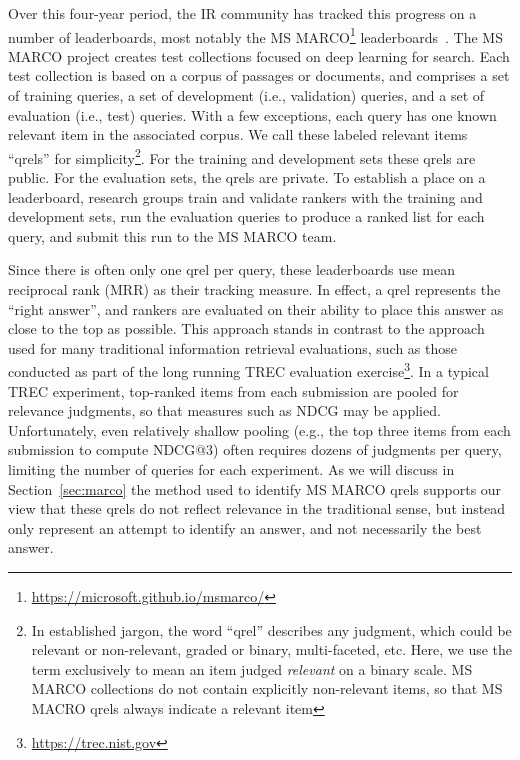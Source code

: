 \documentclass[fullpage]{article}
\begin{document}
Over this four-year period, the IR community has tracked this progress on a number of leaderboards, most notably the MS MARCO\footnote{\url{https://microsoft.github.io/msmarco/}} leaderboards~\cite{marco21short,marco21full}. The MS MARCO project creates test collections focused on deep learning for search. Each test collection is based on a corpus of passages or documents, and comprises a set of training queries, a set of development (i.e., validation) queries, and a set of evaluation (i.e., test) queries. With a few exceptions, each query has one known relevant item in the associated corpus. We call these labeled relevant items ``qrels'' for simplicity\footnote{In established jargon, the word ``qrel'' describes any judgment, which could be relevant or non-relevant, graded or binary, multi-faceted, etc. Here, we use the term exclusively to mean an item judged {\em relevant} on a binary scale. MS MARCO collections do not contain explicitly non-relevant items, so that MS MACRO qrels always indicate a relevant item}. For the training and development sets these qrels are public. For the evaluation sets, the qrels are private. To establish a place on a leaderboard, research groups train and validate rankers with the training and development sets, run the evaluation queries to produce a ranked list for each query, and submit this run to the MS MARCO team.

Since there is often only one qrel per query, these leaderboards use mean reciprocal rank (MRR) as their tracking measure. In effect, a qrel represents the ``right  answer'', and rankers are evaluated on their ability to place this answer as close to the top as possible. This approach stands in contrast to the approach used for many traditional information retrieval evaluations, such as those conducted as part of the long running TREC evaluation exercise\footnote{\url{https://trec.nist.gov}}. In a typical TREC experiment, top-ranked items from each submission are pooled for relevance judgments, so that measures such as NDCG may be applied. Unfortunately, even relatively shallow pooling (e.g., the top three items from each submission to compute NDCG@3) often requires dozens of judgments per query, limiting the number of queries for each experiment. As we will discuss in Section~\ref{sec:marco} the method used to identify MS MARCO qrels supports our view that these qrels do not reflect relevance in the traditional sense, but instead only represent an attempt to identify an answer, and not necessarily the best answer.
\end{document}
